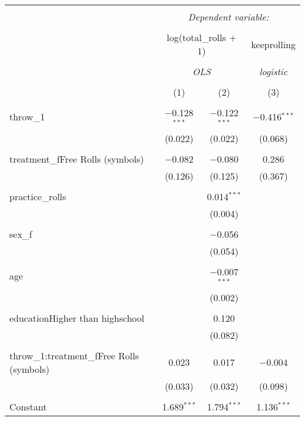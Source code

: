 
\begin{table}[!htbp] \centering 
  \caption{} 
  \label{} 
\begin{tabular}{@{\extracolsep{5pt}}lccc} 
\\[-1.8ex]\hline 
\hline \\[-1.8ex] 
 & \multicolumn{3}{c}{\textit{Dependent variable:}} \\ 
\cline{2-4} 
\\[-1.8ex] & \multicolumn{2}{c}{log(total\_rolls + 1)} & keeprolling \\ 
\\[-1.8ex] & \multicolumn{2}{c}{\textit{OLS}} & \textit{logistic} \\ 
\\[-1.8ex] & (1) & (2) & (3)\\ 
\hline \\[-1.8ex] 
 throw\_1 & $-$0.128$^{***}$ & $-$0.122$^{***}$ & $-$0.416$^{***}$ \\ 
  & (0.022) & (0.022) & (0.068) \\ 
  & & & \\ 
 treatment\_fFree Rolls (symbols) & $-$0.082 & $-$0.080 & 0.286 \\ 
  & (0.126) & (0.125) & (0.367) \\ 
  & & & \\ 
 practice\_rolls &  & 0.014$^{***}$ &  \\ 
  &  & (0.004) &  \\ 
  & & & \\ 
 sex\_f &  & $-$0.056 &  \\ 
  &  & (0.054) &  \\ 
  & & & \\ 
 age &  & $-$0.007$^{***}$ &  \\ 
  &  & (0.002) &  \\ 
  & & & \\ 
 educationHigher than highschool &  & 0.120 &  \\ 
  &  & (0.082) &  \\ 
  & & & \\ 
 throw\_1:treatment\_fFree Rolls (symbols) & 0.023 & 0.017 & $-$0.004 \\ 
  & (0.033) & (0.032) & (0.098) \\ 
  & & & \\ 
 Constant & 1.689$^{***}$ & 1.794$^{***}$ & 1.136$^{***}$ \\ 

\end{tabular}
\end{table}
